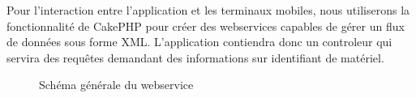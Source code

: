 Pour l'interaction entre l'application et les terminaux mobiles, nous utiliserons la fonctionnalité de CakePHP pour créer des webservices capables de gérer un flux de données sous forme XML.
L'application contiendra donc un controleur qui servira des requêtes demandant des informations sur identifiant de matériel.

\begin{figure}[H]
	\begin{center}\end{center}
	\caption{Schéma générale du webservice}
\end{figure}

